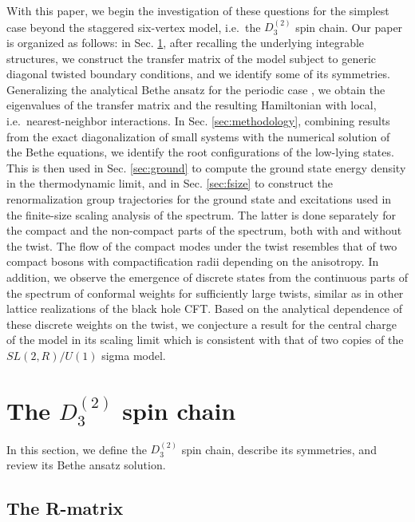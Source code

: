 \documentclass[12pt]{article}
\numberwithin{equation}{section}
\begin{document}
With this paper, we begin the investigation of these questions for the simplest case beyond the staggered six-vertex model, i.e.\ the $D^{(2)}_3$ spin chain.  Our paper is organized as follows: in Sec. \ref{sec:basics}, after recalling the underlying integrable structures, we construct the transfer matrix of the model subject to generic diagonal twisted boundary conditions, and we identify some of its symmetries.  Generalizing the analytical Bethe ansatz for the periodic case \cite{Resh87}, we obtain the eigenvalues of the transfer matrix and the resulting Hamiltonian with local, i.e.\ nearest-neighbor interactions.  In Sec. \ref{sec:methodology}, combining results from the exact diagonalization of small systems with the numerical solution of the Bethe equations, we identify the root configurations of the low-lying states.  This is then used in Sec. \ref{sec:ground}
to compute the ground state energy density in the thermodynamic limit, and in Sec. \ref{sec:fsize}
to construct the renormalization group trajectories for the ground state and excitations used in the finite-size scaling analysis of the spectrum.  The latter is done separately for the compact and the non-compact parts of the spectrum, both with and without the twist.  The flow of the compact modes under the twist resembles that of two compact bosons with compactification radii depending on the anisotropy.  In addition, we observe the emergence of discrete states from  the continuous parts of the spectrum of conformal weights for sufficiently large twists, similar as in other lattice realizations of the black hole CFT. Based on the analytical dependence of these discrete weights on the twist, we conjecture a result for the central charge of the model in its scaling limit which is consistent with that of two copies of the $SL(2,R)/U(1)$ sigma model.


\section{The \texorpdfstring{$D^{(2)}_3$}{D23} spin chain}\label{sec:basics}

In this section, we define the $D^{(2)}_3$ spin chain, describe its symmetries, and review its Bethe ansatz solution.

\subsection{The R-matrix}
\end{document}
